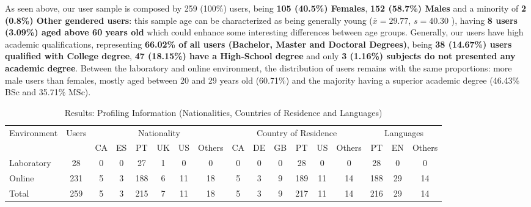 %
As seen above, our user sample is composed by 259 (100\%) users, being \textbf{105 (40.5\%) Females}, \textbf{152 (58.7\%) Males} and a minority of \textbf{2 (0.8\%) Other gendered users}: this sample age can
be characterized as being generally young ($\overline{x} = 29.77$, $s = 40.30$ ), having \textbf{8 users (3.09\%) aged above 60 years old} which could enhance some interesting
differences between age groups. Generally, our users have high academic qualifications, representing \textbf{66.02\% of all users (Bachelor, Master and Doctoral Degrees)}, being \textbf{38 (14.67\%) users
qualified with College degree}, \textbf{47 (18.15\%) have a High-School degree} and only \textbf{3 (1.16\%) subjects do not presented any academic degree}. Between the laboratory and online environment, the distribution
of users remains with the same proportions: more male users than females, mostly aged between 20 and 29 years old (60.71\%) and the majority having a superior academic degree (46.43\% BSc and 35.71\% MSc). \par
%
\begin{table}[htbp]
  \resizebox{\textwidth}{!} {
  \begin{tabular}{| l || c || c | c | c | c | c | c || c | c | c | c | c | c || c | c | c |}
    \hline
    \multicolumn{1}{|c||}{\multirow{2}{*}{Environment}} & \multirow{2}{*}{Users} & \multicolumn{6}{c||}{Nationality} & \multicolumn{6}{c||}{Country of Residence} & \multicolumn{3}{c|}{Languages} \\ \cline{3-17}
    \multicolumn{1}{|c||}{}                             &                        & CA  & ES & PT & UK & US & Others & CA   & DE   & GB   & PT   & US  & Others  & PT      & EN      & Others     \\ \hline
    Laboratory                                         & 28                     & 0   & 0  & 27 & 1  & 0  & 0      & 0    & 0    & 0    & 28   & 0   & 0       & 28      & 0       & 0          \\ \hline
    Online                                             & 231                    & 5   & 3  & 188& 6  & 11 & 18     & 5    & 3    & 9    & 189  & 11  & 14      & 188     & 29      & 14         \\ \hline \hline
    Total                                              & 259                    & 5   & 3  & 215& 7  & 11 & 18     & 5    & 3    & 9    & 217  & 11  & 14      & 216     & 29      & 14         \\ \hline
  \end{tabular}}
  \caption[Results: Profiling Information (Nationalities, Countries of Residence and Languages)]{Results: Profiling Information (Nationalities, Countries of Residence and Languages)}
  \vspace{-5pt}
  \label{table:profiling_nacionalities}
\end{table}
